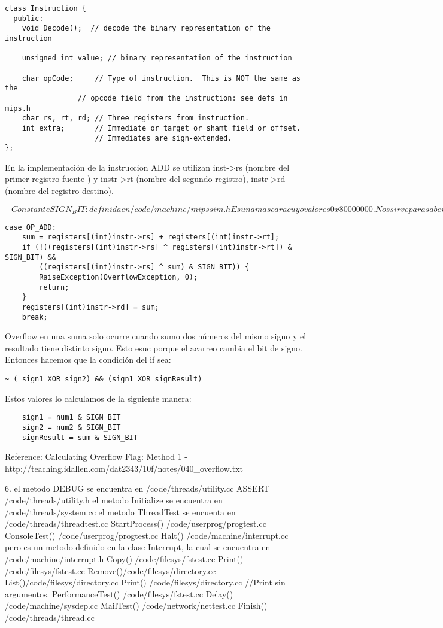 \documentclass[a4paper, 11pt]{article}
\begin{document}
\begin{lstlisting}[style=C]
class Instruction {
  public:
    void Decode();	// decode the binary representation of the instruction

    unsigned int value; // binary representation of the instruction

    char opCode;     // Type of instruction.  This is NOT the same as the
    		     // opcode field from the instruction: see defs in mips.h
    char rs, rt, rd; // Three registers from instruction.
    int extra;       // Immediate or target or shamt field or offset.
                     // Immediates are sign-extended.
};
\end{lstlisting}

En la implementación de la instruccion ADD se utilizan inst->rs (nombre del primer registro fuente ) y instr->rt (nombre del segundo registro), instr->rd (nombre del registro destino).

$+ Constante SIGN_BIT: definida en /code/machine/mipssim.h
Es una mascara cuyo valor es  0x80000000. Nos sirve para saber que signo tiene el nro.
$
\begin{lstlisting}[style=C]
   case OP_ADD:
	sum = registers[(int)instr->rs] + registers[(int)instr->rt];
	if (!((registers[(int)instr->rs] ^ registers[(int)instr->rt]) & SIGN_BIT) &&
	    ((registers[(int)instr->rs] ^ sum) & SIGN_BIT)) {
	    RaiseException(OverflowException, 0);
	    return;
	}
	registers[(int)instr->rd] = sum;
	break;
\end{lstlisting}

Overflow en una suma solo ocurre cuando sumo dos números del mismo signo y el resultado tiene distinto signo. Esto esuc porque el acarreo cambia el bit de signo.
Entonces hacemos que la condición del if sea:      \begin{verbatim}~ ( sign1 XOR sign2) && (sign1 XOR signResult)\end{verbatim}
Estos valores lo calculamos de la siguiente manera:
\begin{verbatim}
    sign1 = num1 & SIGN_BIT
    sign2 = num2 & SIGN_BIT
    signResult = sum & SIGN_BIT
\end{verbatim}

Reference: Calculating Overflow Flag: Method 1 - http://teaching.idallen.com/dat2343/10f/notes/040_overflow.txt

6. 
    el metodo DEBUG se encuentra en /code/threads/utility.cc
    ASSERT /code/threads/utility.h  
    el metodo Initialize se encuentra en /code/threads/system.cc
    el metodo ThreadTest se encuenta en /code/threads/threadtest.cc
    StartProcess() /code/userprog/progtest.cc
    ConsoleTest() /code/userprog/progtest.cc
    Halt() /code/machine/interrupt.cc pero es un metodo definido en la clase Interrupt, la cual se encuentra en /code/machine/interrupt.h
    Copy() /code/filesys/fstest.cc
    Print() /code/filesys/fstest.cc 
    Remove()/code/filesys/directory.cc
    List()/code/filesys/directory.cc
    Print() /code/filesys/directory.cc //Print sin argumentos. 
    PerformanceTest() /code/filesys/fstest.cc
    Delay() /code/machine/sysdep.cc
    MailTest() /code/network/nettest.cc
    Finish() /code/threads/thread.cc
\end{document}
